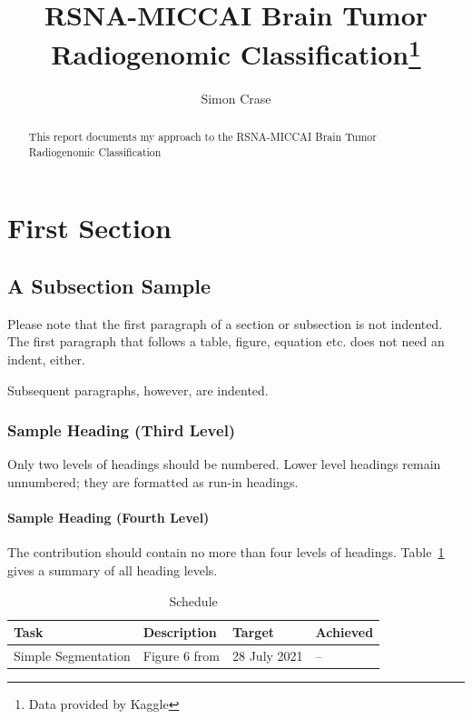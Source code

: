 \documentclass[runningheads]{llncs}
\begin{document}
%
\title{RSNA-MICCAI Brain Tumor Radiogenomic Classification\thanks{Data provided by Kaggle}}
%
%
\author{Simon Crase}
%
%
%
\maketitle              %
%
\begin{abstract}
This report documents my approach to the RSNA-MICCAI Brain Tumor Radiogenomic Classification
\cite{kaggle2021rsna}

\end{abstract}
%
%
%
\section{First Section}
\subsection{A Subsection Sample}
Please note that the first paragraph of a section or subsection is
not indented. The first paragraph that follows a table, figure,
equation etc. does not need an indent, either.

Subsequent paragraphs, however, are indented.

\subsubsection{Sample Heading (Third Level)} Only two levels of
headings should be numbered. Lower level headings remain unnumbered;
they are formatted as run-in headings.

\paragraph{Sample Heading (Fourth Level)}
The contribution should contain no more than four levels of
headings. Table~\ref{tab1} gives a summary of all heading levels.

\begin{table}
\caption{Schedule}\label{tab1}
\begin{tabular}{|l|l|l|l|}
\hline
Task & Description& Target & Achieved\\
\hline
Simple Segmentation&Figure 6 from \cite{ranjbarzadeh2021brain} &  28 July 2021 & --\\
\hline
\end{tabular}
\end{table}
\end{document}
